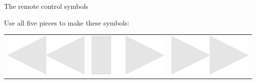 \documentclass[14pt]{beamer}
\begin{document}
    \begin{frame}{The remote control symbols}
        \begin{center}
            Use all five pieces to make these symbols:

            \bigskip\bigskip

            \begin{tabular}{ccc}
                      \includegraphics[scale=0.2]{figures/figure026i.pdf} \quad&
                 \quad\includegraphics[scale=0.2]{figures/figure026j.pdf} \quad&
                 \quad\includegraphics[scale=0.2]{figures/figure026k.pdf} \\

\end{tabular}
\end{center}
\end{frame}
\end{document}
